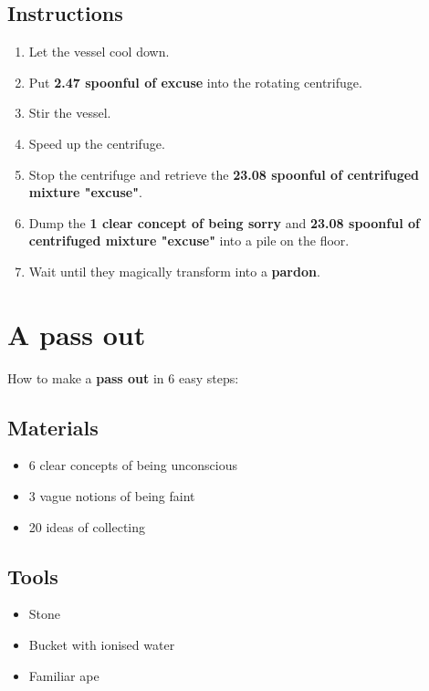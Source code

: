 \documentclass{article}
\begin{document}
\subsection{Instructions}\begin{enumerate}
\item 
Let the vessel cool down.
\item 
Put \textbf{2.47 spoonful of excuse} into the rotating centrifuge.
\item 
Stir the vessel.
\item 
Speed up the centrifuge.
\item 
Stop the centrifuge and retrieve the \textbf{23.08 spoonful of centrifuged mixture "excuse"}.
\item 
Dump the \textbf{1 clear concept of being sorry} and \textbf{23.08 spoonful of centrifuged mixture "excuse"} into a pile on the floor.
\item 
Wait until they magically transform into a \textbf{pardon}.
\end{enumerate}
\newpage
\section{A pass out}How to make a \textbf{pass out} in 6 easy steps:

\subsection{Materials}\begin{itemize}
\item 
6 clear concepts of being unconscious
\item 
3 vague notions of being faint
\item 
20 ideas of collecting
\end{itemize}
\subsection{Tools}\begin{itemize}
\item 
Stone
\item 
Bucket with ionised water
\item 
Familiar ape
\end{itemize}
\end{document}

